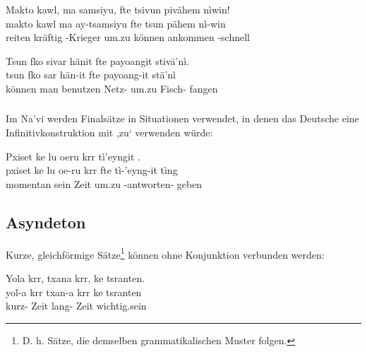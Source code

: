 \begin{interlin}
	\glll \Npawl{}Makto kawl, ma samsiyu, fte tsivun pivähem nìwin! \\
	makto kawl ma ay-tsamsiyu fte tsun pähem nì-win \\
	reiten kräftig  -Krieger um.zu können ankommen -schnell \\
\end{interlin}

\begin{interlin}
	\glll \Npawl{}Tsun fko sivar hänit fte payoangit stivä'nì. \\
	tsun fko sar hän-it fte payoang-it stä'nì \\
	können man benutzen Netz- um.zu Fisch- fangen \\
\end{interlin}

\subsubsection{} Im Na'vi werden Finalsätze in Situationen verwendet, in denen das Deutsche eine Infinitivkonstruktion mit ,zu‘ verwenden würde:

\begin{interlin}
	\glll \Npawl{}Pxiset ke lu oeru krr  tì'eyngit . \\
	pxiset ke lu oe-ru krr fte tì-'eyng-it tìng \\
	momentan  sein  Zeit um.zu -antworten- geben \\
\end{interlin}

\subsection{Asyndeton} Kurze, gleichförmige Sätze\footnote{D. h. Sätze, die demselben grammatikalischen Muster folgen.} können ohne Konjunktion verbunden werden:

\begin{interlin}
	\glll \Npawl{}Yola krr, txana krr, ke tsranten. \\
	yol-a krr txan-a krr ke tsranten \\
	kurz- Zeit lang- Zeit  wichtig.sein \\
\end{interlin}

